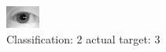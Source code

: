 \begin{figure}[h!]
\begin{center}
\includegraphics[width=0.60\columnwidth]{figures/ID1158_class_2_target_3.png}
\end{center}
\caption{ Classification: 2 actual target: 3}
\label{fig:ID1158_class_2_target_3}
\end{figure}
